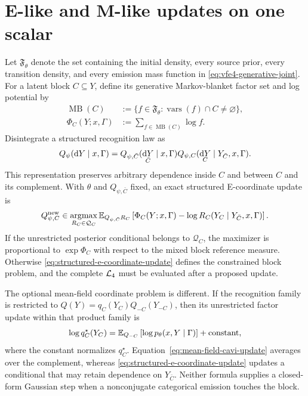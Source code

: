 \section{E-like and M-like updates on one scalar}

Let $\mathfrak F_\theta$ denote the set containing the initial density, every source prior, every transition density, and every emission mass function in \cref{eq:vfe4-generative-joint}. For a latent block $C\subseteq Y$, define its generative Markov-blanket factor set and log potential by
\begin{equation}
\begin{aligned}
\operatorname{MB}(C)
&:=\{f\in\mathfrak F_\theta:
\operatorname{vars}(f)\cap C\ne\varnothing\},\\
\Phi_C(Y;x,\Gamma)
&:=\sum_{f\in\operatorname{MB}(C)}\log f.
\end{aligned}
\label{eq:generative-markov-blanket-potential}
\end{equation}
Disintegrate a structured recognition law as
\begin{equation}
Q_\psi(\mathop{\mathrm dY}\mid x,\Gamma)
=Q_{\psi,\bar C}(\mathop{\mathrm dY}_{\bar C}\mid x,\Gamma)
Q_{\psi,C}(\mathop{\mathrm dY}_C\mid
Y_{\bar C},x,\Gamma).
\label{eq:structured-block-disintegration}
\end{equation}
This representation preserves arbitrary dependence inside $C$ and between $C$ and its complement. With $\theta$ and $Q_{\psi,\bar C}$ fixed, an exact structured E-coordinate update is
\begin{equation}
Q_{\psi,C}^{\mathrm{new}}
\in\operatorname*{argmax}_{R_C\in\mathcal Q_C}
\mathbb E_{Q_{\psi,\bar C}R_C}
\left[
\Phi_C(Y;x,\Gamma)-\log R_C(Y_C\mid Y_{\bar C},x,\Gamma)
\right].
\label{eq:structured-e-coordinate-update}
\end{equation}
If the unrestricted posterior conditional belongs to $\mathcal Q_C$, the maximizer is proportional to $\exp\Phi_C$ with respect to the mixed block reference measure. Otherwise \cref{eq:structured-e-coordinate-update} defines the constrained block problem, and the complete $\mathcal L_4$ must be evaluated after a proposed update.

The optional mean-field coordinate problem is different. If the recognition family is restricted to $Q(Y)=q_C(Y_C)Q_{-C}(Y_{-C})$, then its unrestricted factor update within that product family is
\begin{equation}
\log q_C^\star(Y_C)
=\mathbb E_{Q_{-C}}
\left[
\log p_\theta(x,Y\mid\Gamma)
\right]
+\operatorname{constant},
\label{eq:mean-field-cavi-update}
\end{equation}
where the constant normalizes $q_C^\star$. Equation~\eqref{eq:mean-field-cavi-update} averages over the complement, whereas \cref{eq:structured-e-coordinate-update} updates a conditional that may retain dependence on $Y_{\bar C}$. Neither formula supplies a closed-form Gaussian step when a nonconjugate categorical emission touches the block.

